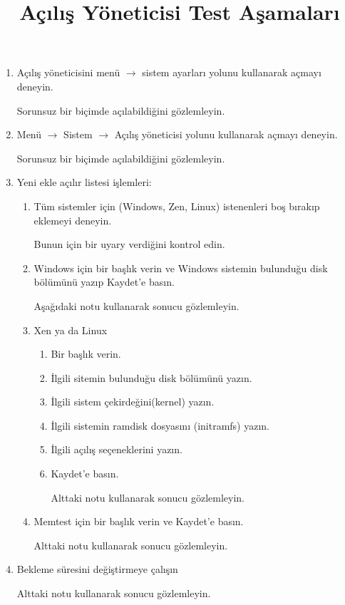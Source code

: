 \documentclass[a4paper,10pt]{article}
\title{Açılış Yöneticisi Test Aşamaları}
\begin{document}
\maketitle

\begin{enumerate}
    \item Açılış yöneticisini menü $\rightarrow$ sistem ayarları yolunu kullanarak açmayı deneyin.

    Sorunsuz bir biçimde açılabildiğini gözlemleyin.
    \item Menü $\rightarrow$ Sistem $\rightarrow$ Açılış yöneticisi yolunu kullanarak açmayı deneyin.

    Sorunsuz bir biçimde açılabildiğini gözlemleyin.
    \item Yeni ekle açılır listesi işlemleri:
    \begin{enumerate}
        \item Tüm sistemler için (Windows, Zen, Linux) istenenleri boş bırakıp eklemeyi deneyin.
    
	 Bunun için bir uyary verdiğini kontrol edin.

        \item Windows için bir başlık verin ve Windows sistemin bulunduğu disk bölümünü yazıp Kaydet'e basın.

            Aşağıdaki notu kullanarak sonucu gözlemleyin.


\item Xen ya da Linux 
\begin{enumerate}
    \item Bir başlık verin.
    \item İlgili sitemin bulunduğu disk bölümünü yazın.
    \item İlgili sistem çekirdeğini(kernel) yazın.
    \item İlgili sistemin ramdisk dosyasını (initramfs) yazın.
    \item İlgili açılış seçeneklerini yazın.
    \item Kaydet'e basın.

          Alttaki notu kullanarak sonucu gözlemleyin.

\end{enumerate}

\item Memtest için bir başlık verin ve Kaydet'e basın.

    Alttaki notu kullanarak sonucu gözlemleyin.

    \end{enumerate}
\item Bekleme süresini değiştirmeye çalışın 

  Alttaki notu kullanarak sonucu gözlemleyin.
\end{enumerate}
\end{document}
